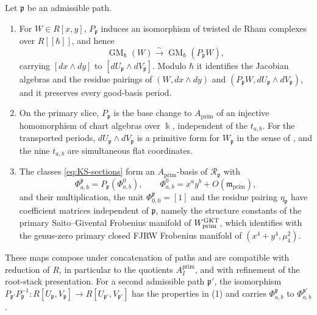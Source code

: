 \begin{proposition}
\label{thm:primary-Frobenius}
\label{prop:Brieskorn-transport}
\label{thm:primary-Saito-system}
Let $\mathfrak p$ be an admissible path.
\begin{enumerate}
\item For $W\in R[x,y]$, $P_{\mathfrak p}$ induces an isomorphism of twisted
de Rham complexes over $R[[\hbar]]$, and hence
\begin{equation}\label{eq:Brieskorn-transport}
 \operatorname{GM}_\hbar(W)
 \xrightarrow{\sim}
 \operatorname{GM}_\hbar(P_{\mathfrak p} W),
\end{equation}
carrying $[dx\wedge dy]$ to $[dU_{\mathfrak p}\wedge dV_{\mathfrak p}]$.
Modulo $\hbar$ it identifies the Jacobian algebras and the residue pairings of
$(W,dx\wedge dy)$ and $(P_{\mathfrak p}W,dU_{\mathfrak p}\wedge
dV_{\mathfrak p})$, and it preserves every good-basis period.
\item On the primary slice, $P_{\mathfrak p}$ is the base change to
$A_{\mathrm{prim}}$ of an injective homomorphism of chart algebras over
$\Bbbk$, independent of the $t_{a,b}$.  For the transported periods,
$dU_{\mathfrak p}\wedge dV_{\mathfrak p}$ is a primitive form for
$W_{\mathfrak p}$ in the sense of \cite[Def.~4.3]{grossetal2022open}, and the
nine $t_{a,b}$ are simultaneous flat coordinates.
\item The classes \eqref{eq:KS-sections} form an $A_{\mathrm{prim}}$-basis of
$\mathcal R_{\mathfrak p}$ with
\begin{equation}\label{eq:KS-naturality}
 \Phi_{a,b}^{\mathfrak p}=P_{\mathfrak p}(\Phi_{a,b}^0),
 \qquad
 \Phi_{a,b}^0=x^ay^b+O(\mathfrak m_{\mathrm{prim}}),
\end{equation}
and their multiplication, the unit $\Phi_{0,0}^{\mathfrak p}=[1]$ and the
residue pairing $\eta_{\mathfrak p}$ have coefficient matrices independent of
$\mathfrak p$, namely the structure constants of the primary Saito--Givental
Frobenius manifold of $W^{\mathrm{GKT}}_{\mathrm{prim}}$, which
\cite[Thm.~0.3 and Rem.~0.4(2)]{grossetal2022open} identifies with the
genus-zero primary closed FJRW Frobenius manifold of $(x^4+y^4,\mu_4^2)$.
\end{enumerate}
These maps compose under concatenation of paths and are compatible with
reduction of $R$, in particular to the quotients $A^{\mathrm{prim}}_I$, and
with refinement of the root-stack presentation.  For a second admissible path
$\mathfrak p'$, the isomorphism
$P_{\mathfrak p'}P_{\mathfrak p}^{-1}:R[U_{\mathfrak p},V_{\mathfrak p}]\to
R[U_{\mathfrak p'},V_{\mathfrak p'}]$ has the properties in (1) and carries
$\Phi^{\mathfrak p}_{a,b}$ to $\Phi^{\mathfrak p'}_{a,b}$.
\end{proposition}

